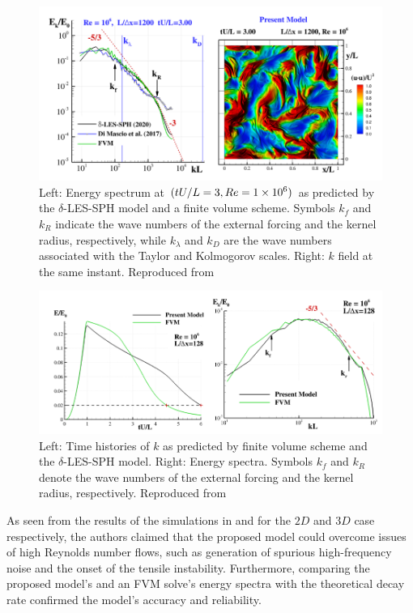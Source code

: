 \begin{figure}[htbp!]
    \centering
    \includegraphics[scale=0.7]{Figures/research_papers/Colagrossi2021QuasiLagrangian-fig-4.png}
    \caption{Left: Energy spectrum at $(tU/L = 3, Re = 1 \times {10}^{6})$ as predicted by the $\delta$-LES-SPH model and a finite volume scheme. Symbols $k_f$ and $k_R$ indicate the wave numbers of the external forcing and the kernel radius, respectively, while $k_{\lambda}$ and $k_D$ are the wave numbers associated with the Taylor and Kolmogorov scales. Right: $k$ field at the same instant. Reproduced from \cite{Colagrossi2021QuasiLagrangian}}
    \label{fig:Colagrossi2021QuasiLagrangian-fig-4}
\end{figure}
\begin{figure}[htbp!]
    \centering
    \includegraphics[scale=0.65]{Figures/research_papers/Colagrossi2021QuasiLagrangian-fig-8.png}
    \caption{Left: Time histories of $k$ as predicted by finite volume scheme and the $\delta$-LES-SPH model. Right: Energy spectra. Symbols $k_f$ and $k_R$ denote the wave numbers of the external forcing and the kernel radius, respectively. Reproduced from \cite{Colagrossi2021QuasiLagrangian}}
    \label{fig:Colagrossi2021QuasiLagrangian-fig-8}
\end{figure}

As seen from the results of the simulations in  and  for the $2D$ and $3D$ case respectively, the authors claimed that the proposed model could overcome issues of high Reynolds number flows, such as generation of spurious high-frequency noise and the onset of the tensile instability. Furthermore, comparing the proposed model’s and an FVM solve’s energy spectra with the theoretical decay rate confirmed the model’s accuracy and reliability.

